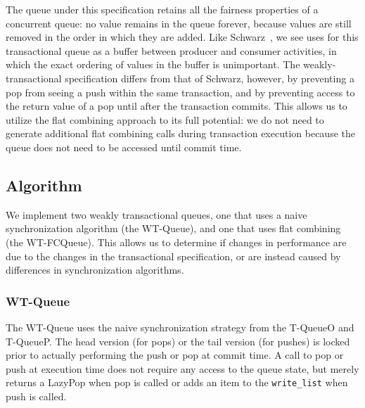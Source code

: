 The queue under this specification retains all the fairness properties of a concurrent queue: no value remains in the queue forever, because values are still removed in the order in which they are added. Like Schwarz~\cite{schwarz}, we see uses for this transactional queue as a buffer between producer and consumer activities, in which the exact ordering of values in the buffer is unimportant.
The weakly-transactional specification differs from that of Schwarz, however, by preventing a pop from seeing a push within the same transaction, and by preventing access to the return value of a pop until after the transaction commits. This allows us to utilize the flat combining approach to its full potential: we do not need to generate additional flat combining calls during transaction execution because the queue does not need to be accessed until commit time.

\subsection{Algorithm}

We implement two weakly transactional queues, one that uses a naive synchronization algorithm (the WT-Queue), and one that uses flat combining (the WT-FCQueue). This allows us to determine if changes in performance are due to the changes in the transactional specification, or are instead caused by differences in synchronization algorithms.

\subsubsection{WT-Queue}
The WT-Queue uses the naive synchronization strategy from the T-QueueO and T-QueueP. The head version (for pops) or the tail version (for pushes) is locked prior to actually performing the push or pop at commit time. A call to pop or push at execution time does not require any access to the queue state, but merely returns a LazyPop when pop is called or adds an item to the \texttt{write\_list} when push is called.


